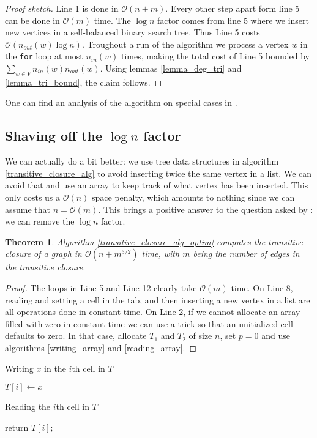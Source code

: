 \documentclass[11pt,a4paper]{article}
\newcommand{\BigO}{\mathcal O}
\newtheorem{Theo}{Theorem}
\theoremstyle{definition}
\begin{document}
\begin{proof}[Proof sketch]
Line 1 is done in $\BigO(n+m)$.
Every other step apart form line 5 can be done in $\BigO(m)$ time.
The $\log n$ factor comes from line 5 where we insert new
vertices in a self-balanced binary search tree. Thus Line 5
costs $\BigO(n_{out}(w)\log n)$. Troughout a run of 
the algorithm we process a vertex $w$ in the \texttt{for} loop at
most $n_{in}(w)$ times, making the total cost of
Line 5 bounded by $\sum_{w\in V}n_{in}(w)n_{out}(w)$. Using lemmas
\ref{lemma_deg_tri} and \ref{lemma_tri_bound}, the claim follows.
\end{proof}

One can find an analysis of the algorithm on special cases in 
\cite{HABIB1993289}.

\subsection{Shaving off the $\log n$ factor}
We can actually do a bit better: we use tree data structures
in algorithm \ref{transitive_closure_alg} to avoid
inserting twice the same vertex in a list. We can avoid that and
use an array to keep track of what vertex has been inserted.
This only costs us a $\BigO(n)$ space
penalty, which amounts to nothing since we can assume that $n=\BigO(m)$.
This brings a positive answer to the question asked by
\cite{borassi2015into}: we can remove the $\log n$ factor. 

\begin{Theo}
Algorithm \ref{transitive_closure_alg_optim} computes the transitive closure
of a graph in $\BigO(n+m^{3/2})$ time, with $m$ being the number of edges
in the transitive closure.
\end{Theo}

\begin{proof}
The loops in Line 5 and Line 12 clearly take $\BigO(m)$ time.
On Line 8, reading and setting a cell in the tab, and then inserting
a new vertex in a list are all operations done in constant time.
On Line 2, if we cannot allocate an array filled with zero in constant
time we can use a trick \cite[Exercise 2.12]{aho74} so that an unitialized cell
defaults to zero. In that case, allocate $T_1$ and $T_2$ of size $n$, 
set $p=0$ and use algorithms \ref{writing_array} and \ref{reading_array}.
\end{proof}

\begin{algorithm}
  \label{writing_array}
  \LinesNumbered
  \SetAlgoVlined
  \caption{Writing $x$ in the $i$th cell in $T$}

  $T[i] \gets x$\;
\end{algorithm}
\begin{algorithm}
  \label{reading_array}
  \LinesNumbered
  \SetAlgoVlined
  \caption{Reading the $i$th cell in $T$}
  return $T[i]$;
\end{algorithm}
\end{document}
